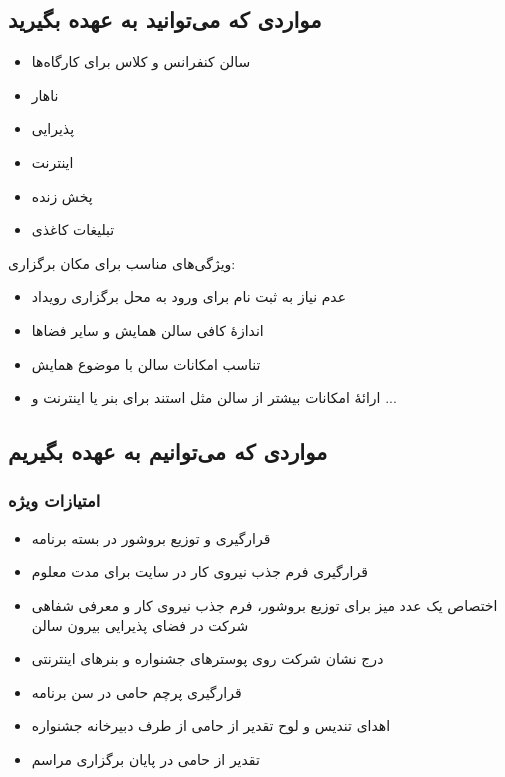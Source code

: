 \documentclass{article}
\begin{document}
{{\begin{flushright}
\end{flushright}

\subsection{مواردی که می‌توانید به عهده بگیرید}


\begin{flushright}

\begin{itemize}
\item سالن کنفرانس و کلاس برای کارگاه‌ها
\item ناهار
\item پذیرایی
\item اینترنت
\item پخش زنده
\item تبلیغات کاغذی
\end{itemize}

\end{flushright}

\begin{flushright}

ویژگی‌های مناسب برای مکان برگزاری:

\begin{itemize}
\item عدم نیاز به ثبت نام برای ورود به محل برگزاری رویداد
\item اندازهٔ کافی سالن همایش و سایر فضاها
\item تناسب امکانات سالن با موضوع همایش
\item ارائهٔ امکانات بیشتر از سالن مثل استند برای بنر یا اینترنت و ... 
\end{itemize}

\end{flushright}

\subsection{مواردی که می‌توانیم به عهده بگیریم}

\subsubsection{امتیازات ویژه}

\begin{flushright}
\begin{itemize}
\item قرارگیری و توزیع بروشور در بسته برنامه
\item قرارگیری فرم جذب نیروی کار در سایت برای مدت معلوم
\item اختصاص یک عدد میز برای توزیع بروشور، فرم جذب نیروی کار و معرفی شفاهی شرکت در فضای پذیرایی بیرون سالن
\item درج نشان شرکت روی پوسترهای جشنواره و بنرهای اینترنتی
\item قرارگیری پرچم حامی در سن برنامه
\item اهدای تندیس و لوح تقدیر از حامی از طرف دبیرخانه جشنواره
\item تقدیر از حامی در پایان برگزاری مراسم
\end{itemize}
\end{flushright}

}}
\end{document}

